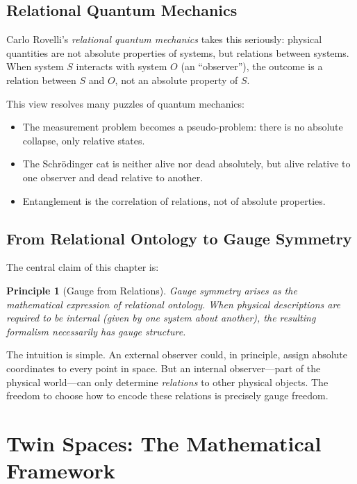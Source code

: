 \documentclass[11pt,a4paper,openright]{book}
\theoremstyle{plain}
\newtheorem{principle}[theorem]{Principle}
\theoremstyle{definition}
\begin{document}
\subsection{Relational Quantum Mechanics}

Carlo Rovelli's \emph{relational quantum mechanics} takes this seriously: physical quantities are not absolute properties of systems, but relations between systems. When system $S$ interacts with system $O$ (an ``observer''), the outcome is a relation between $S$ and $O$, not an absolute property of $S$.

This view resolves many puzzles of quantum mechanics:

\begin{itemize}
    \item The measurement problem becomes a pseudo-problem: there is no absolute collapse, only relative states.
    
    \item The Schrödinger cat is neither alive nor dead absolutely, but alive relative to one observer and dead relative to another.
    
    \item Entanglement is the correlation of relations, not of absolute properties.
\end{itemize}

\subsection{From Relational Ontology to Gauge Symmetry}

The central claim of this chapter is:

\begin{principle}[Gauge from Relations]
\label{prin:gauge-relations}
Gauge symmetry arises as the mathematical expression of relational ontology. When physical descriptions are required to be internal (given by one system about another), the resulting formalism necessarily has gauge structure.
\end{principle}

The intuition is simple. An external observer could, in principle, assign absolute coordinates to every point in space. But an internal observer---part of the physical world---can only determine \emph{relations} to other physical objects. The freedom to choose how to encode these relations is precisely gauge freedom.

\section{Twin Spaces: The Mathematical Framework}
\end{document}
